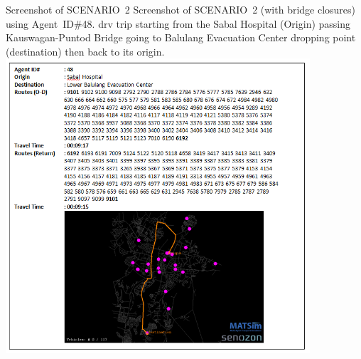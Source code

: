 \createfigure%
{Screenshot of SCENARIO~2}%
{Screenshot of SCENARIO~2 (with bridge closures) using Agent~ID\#48. \protect\gls{drv} trip starting from the Sabal Hospital (Origin) passing Kauswagan-Puntod Bridge going to Balulang Evacuation Center dropping point (destination) then back to its origin.}%
{\label{fig:philippines_fig5}}%
{\includegraphics[width=0.85\textwidth, angle=0]{./using/figures/philippines_fig5.png}}%
{}







 
